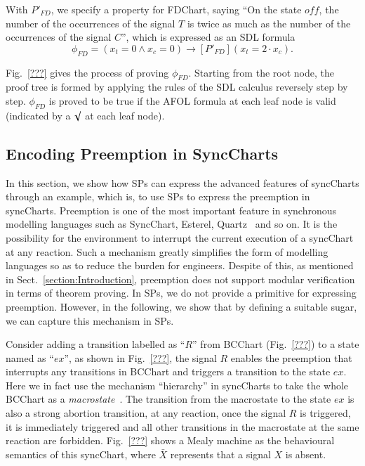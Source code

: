 \documentclass{fcs}
\begin{document}
With $P'_{\mathit{FD}}$, we specify a property for FDChart, saying ``On the state $\mathit{off}$, the number of the occurrences of the signal $T$ is twice as much as the number of the occurrences of the signal $C$'', which is expressed as an SDL formula
$$
\phi_{\mathit{FD}} = (x_t=0\wedge x_c = 0) \to [P'_{\mathit{FD}}](x_t = 2\cdot x_c).
$$

Fig.~\ref{???} gives the process of proving $\phi_{\mathit{FD}}$.
Starting from the root node, the proof tree is formed by applying the rules of the SDL calculus reversely step by step.
$\phi_{\mathit{FD}}$ is proved to be true if the AFOL formula at each leaf node is valid (indicated by a $\surd$ at each leaf node).

\fi

\ifx
\subsection{Encoding Preemption in SyncCharts}
\label{section:Encoding Preemption in SyncCharts}

In this section, we show how SPs can express the advanced features of syncCharts through an example, which is, to use SPs to express the preemption in syncCharts.
Preemption is one of the most important feature in synchronous modelling languages such as SyncChart, Esterel, Quartz~\cite{???} and so on.
It is the possibility for the environment to interrupt the current execution of a syncChart at any reaction.
Such a mechanism greatly simplifies the form of modelling languages so as to reduce the burden for engineers.
Despite of this, as mentioned in Sect.~\ref{section:Introduction}, preemption does not support modular verification in terms of theorem proving.
In SPs, we do not provide a primitive for expressing preemption.
However, in the following, we show that by defining a suitable sugar, we can capture this mechanism in SPs.

Consider adding a transition labelled as ``$R$'' from BCChart (Fig.~\ref{???}) to a state named as ``$\mathit{ex}$'', as shown in Fig.~\ref{???},
the signal $R$ enables the preemption that interrupts any transitions in BCChart and triggers a transition to the state $\mathit{ex}$.
Here we in fact use the mechanism ``hierarchy'' in syncCharts to take the whole BCChart as a \emph{macrostate}~\cite{???}.
The transition from the macrostate to the state $\mathit{ex}$ is also a strong abortion transition, at any reaction, once the signal $R$ is triggered,
it is immediately triggered and all other transitions in the macrostate at the same reaction are forbidden.
Fig.~\ref{???} shows a Mealy machine as the behavioural semantics of this syncChart, where $\bar{X}$ represents that a signal $X$ is absent.
\fi
\end{document}
